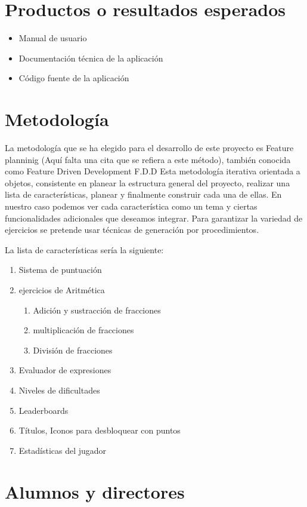 \documentclass{article}
\begin{document}
\section{Productos o resultados esperados}
\begin{itemize}
	\item Manual de usuario
	\item Documentación técnica de la aplicación
	\item Código fuente de la aplicación
\end{itemize}



\section{Metodología}
La metodología que se ha elegido para el desarrollo de este proyecto es Feature planninig 
(Aquí falta una cita que se refiera a este método), también conocida como Feature Driven 
Development F.D.D Esta metodología iterativa orientada a objetos, consistente en planear 
la estructura general del proyecto, realizar una lista de características, planear y finalmente 
construir cada una de ellas. En nuestro caso podemos ver cada característica como un tema y ciertas 
funcionalidades adicionales que deseamos integrar. Para garantizar la variedad de ejercicios se 
pretende usar técnicas de generación por procedimientos.

La lista de características sería la siguiente:
\begin{enumerate}
	\item Sistema de puntuación
	\item ejercicios de Aritmética
	\begin{enumerate}
		\item Adición y sustracción de fracciones
		\item multiplicación de fracciones
		\item División de fracciones
	\end{enumerate}
	\item Evaluador de expresiones
	\item Niveles de dificultades
	\item Leaderboards
	\item Títulos, Iconos para desbloquear con puntos
	\item Estadísticas del jugador
\end{enumerate}


\section{Alumnos y directores}
\end{document}
